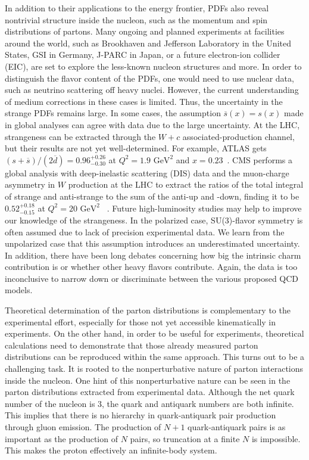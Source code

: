 In addition to their applications to the energy frontier, PDFs also reveal
nontrivial structure inside the nucleon, such as the momentum and spin distributions 
of partons. Many ongoing and planned experiments at facilities around 
the world, such as Brookhaven and Jefferson Laboratory in the United States, GSI in Germany, J-PARC in
Japan, or a future electron-ion collider (EIC), are set to explore the less-known 
nucleon structures and more. 
In order to distinguish the flavor content of the PDFs, one would need to 
use nuclear data, such as neutrino scattering off heavy nuclei. However, the current understanding
of medium corrections in these cases is limited. Thus, the uncertainty in the strange
PDFs remains large. In some cases, the assumption $\overline{s}(x)=s(x)$
made in global analyses can agree with data due to the large uncertainty. 
At the LHC, strangeness can be extracted through the $W+c$ associated-production channel,
but their results are not yet well-determined. %
For example, ATLAS gets
$(s+\overline{s})/(2\overline{d})=0.96^{+0.26}_{-0.30}$ at $Q^2=1.9\mbox{ GeV}^2$ and 
$x=0.23$~\cite{Aad:2014xca}. 
CMS performs a global analysis with deep-inelastic scattering (DIS) data and the muon-charge asymmetry in 
$W$ production at the LHC to extract the ratios 
of the total integral of strange and anti-strange to the sum of the anti-up and -down, 
finding it to be $0.52^{+0.18}_{-0.15}$ at $Q^2=20\mbox{ GeV}^2$
~\cite{Chatrchyan:2013mza}.
Future high-luminosity studies may help to improve our knowledge of the strangeness. 
In the polarized case, SU(3)-flavor symmetry is often assumed due to lack of precision 
experimental data. We learn from the unpolarized case that this assumption introduces an underestimated uncertainty. 
In addition, there have been long debates concerning how big the intrinsic charm contribution is 
or whether other heavy flavors contribute. Again, the data is too inconclusive to narrow down or discriminate between the various 
proposed QCD models.

Theoretical determination of the parton distributions is complementary to
the experimental effort, especially for those not yet accessible
kinematically in experiments. On the other hand, in order to be useful for
experiments, theoretical calculations need to demonstrate that those already
measured parton distributions can be reproduced within the same approach.
This turns out to be a challenging task. It is rooted to the
nonperturbative nature of parton interactions inside the nucleon. One
hint of this nonperturbative nature can be seen in the parton distributions
extracted from experimental data. Although the net quark number of the nucleon is 3,
the quark and antiquark numbers are both infinite. This implies that there is no
hierarchy in quark-antiquark pair production through gluon emission.
The production of $N+1$ quark-antiquark pairs is as important as the
production of $N$ pairs, so truncation at a finite $N$ is impossible. This
makes the proton effectively an infinite-body system.

